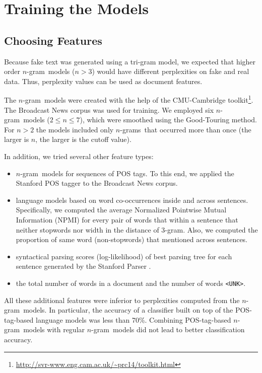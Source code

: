 \documentclass[11pt]{article}
\newcommand{\ngram}{\mbox{$n$-gram }}
\newcommand{\ngrams}{\mbox{$n$-grams }}
\begin{document}
\section{Training the Models}
\subsection{Choosing Features} Because fake text was generated using a tri-gram model, we expected that
higher order \ngram models ($n>3$) would have different perplexities on fake and real data.
Thus, perplexity values can be used as document features.

The \ngram models were created with the help of the CMU-Cambridge toolkit\footnote{\url{http://svr-www.eng.cam.ac.uk/~prc14/toolkit.html}}.  The Broadcast News corpus was used for training.
We employed six \ngram models ($2 \le n \le 7$), which were smoothed using the Good-Touring method.
For $n>2$ the models included only \ngrams that occurred more than once (the larger is $n$, the larger is the cutoff value).

In addition, we tried several other feature types:
\begin{itemize}
\item \ngram models for sequences of POS tags. To this end, we applied the Stanford POS tagger
to the Broadcast News corpus.
\item language models based on word co-occurrences inside and across sentences.  
	Specifically, we computed the average Normalized Pointwise Mutual Information (NPMI) \cite{Manning:1999} for every pair of words that within a sentence that neither stopwords nor width in the distance of 3-gram.
	Also, we computed the proportion of same word (non-stopwords) that mentioned across sentences.
\item 
	syntactical parsing scores (log-likelihood) of best parsing tree for each sentence generated by the Stanford Parser \cite{Klein03}. 
\item the total number of words in a document and the number of words \texttt{<UNK>}.
\end{itemize}
All these additional features were inferior to perplexities computed from the \ngram models.
In particular, the accuracy of a classifier built on top of the POS-tag-based language models
was less than 70\%. Combining POS-tag-based \ngram models with regular \ngram models did not lead
to better classification accuracy.
\end{document}
